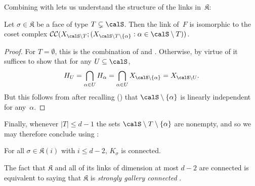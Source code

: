 \documentclass[11pt]{article}
\newcommand{\CC}[2]{\mathcal{C}\mathcal{C}(#1;#2)}
\newcommand{\Esc}[2]{\ol{\mathrm{G}}(#1,#2)}
\newcommand{\complex}{\mathfrak{K}}
\begin{document}
Combining  with  lets us understand the structure of the links in~$\complex$:
\begin{theorem} \label{thm:linkstruct}
    Let $\sigma \in \complex$ be a face of type $T \subsetneq \calS$.
    Then the link of~$F$ is isomorphic to the coset complex $\CC{X_{\calS \setminus T}}{(X_{\calS \setminus T \setminus \{\alpha\}} : \alpha \in \calS \setminus T)}$.
\end{theorem}
\begin{proof}
    For $T = \emptyset$, this is the combination of  and .  Otherwise, by virtue of  it suffices to show that for any $U \subseteq \calS$,
    \[
        H_U = \bigcap_{\alpha \in U} H_\alpha =  \bigcap_{\alpha \in U} X_{\calS \setminus \{\alpha\}} = X_{\calS \setminus U}.
    \]
    But this follows from  after recalling () that $\calS \setminus \{\alpha\}$ is linearly independent for any~$\alpha$.
\end{proof}

Finally, whenever $|T| \leq d-1$ the sets $\calS \setminus T \setminus \{\alpha\}$ are nonempty, and so we may therefore conclude using :
\begin{corollary}\label{cor:connectedlinks}
    For all $\sigma \in \complex(i)$ with $i \le d-2$, $K_\sigma$ is connected.
\end{corollary}

\begin{remark}
The fact that $\complex$ and all of its links of dimension at most $d-2$ are connected is equivalent to saying that $\complex$ is \emph{strongly gallery connected} \cite[Rem.~2.1]{KO18}.
\end{remark}
\end{document}
